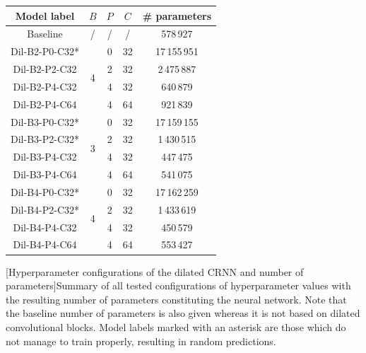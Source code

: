 \begin{table}[t]
\centering
\begin{tabular}{|c|ccc|c|}
\hline
\textbf{Model label}   & \textbf{$B$}                & \textbf{$P$}                & \textbf{$C$} & \textbf{\# parameters}             \\ \hline
Baseline      &   /                 &    /                &  /   & 578\,927                  \\ \hline
Dil-B2-P0-C32* & \multirow{4}{*}{4}                  & 0                  & 32  & 17\,155\,951              \\
Dil-B2-P2-C32 &                    & 2                  & 32  & 2\,475\,887               \\
Dil-B2-P4-C32 &                    & 4 & 32  & 640\,879                  \\
Dil-B2-P4-C64 &                    & 4                   & 64  & 921\,839                  \\ \hline
Dil-B3-P0-C32* & \multirow{4}{*}{3} & 0                  & 32  & 17\,159\,155              \\
Dil-B3-P2-C32* &                    & 2                  & 32  & 1\,430\,515               \\
Dil-B3-P4-C32 &                    & 4 & 32  & 447\,475                  \\
Dil-B3-P4-C64 &                    & 4                   & 64  & 541\,075                  \\ \hline
Dil-B4-P0-C32* & \multirow{4}{*}{4} & 0                  & 32  & 17\,162\,259              \\
Dil-B4-P2-C32* &                    & 2                  & 32  & 1\,433\,619 \\
Dil-B4-P4-C32 &                    & 4 & 32  & 450\,579                  \\
Dil-B4-P4-C64 &                    & 4                   & 64  & 553\,427\\    
\hline
\end{tabular}
[Hyperparameter configurations of the dilated CRNN and number of parameters]{Summary of all tested configurations of hyperparameter values with the resulting number of parameters constituting the neural network. Note that the baseline number of parameters is also given whereas it is not based on dilated convolutional blocks. Model labels marked with an asterisk are those which do not manage to train properly, resulting in random predictions.}
\label{tab:TDVVdilatedNetworksParameters}
\end{table}

